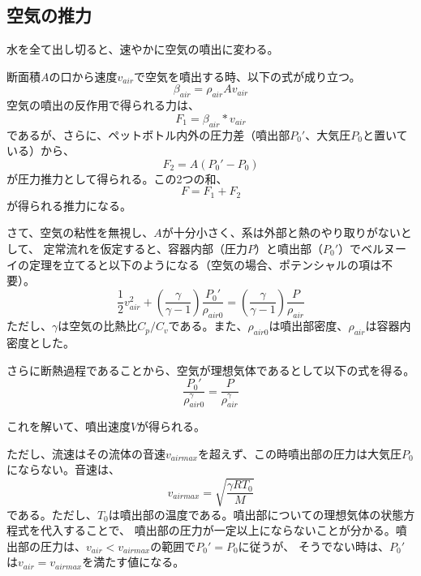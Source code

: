 \documentclass{article}
\begin{document}
\subsection{ 空気の推力 }

水を全て出し切ると、速やかに空気の噴出に変わる。

断面積$A$の口から速度$v_{air}$で空気を噴出する時、以下の式が成り立つ。
\begin{equation}
\beta_{air} = \rho_{air} A v_{air}
\end{equation}
空気の噴出の反作用で得られる力は、
\begin{equation}
F_1 = \beta_{air} * v_{air}
\end{equation}
であるが、さらに、ペットボトル内外の圧力差（噴出部$P_0'$、大気圧$P_0$と置いている）から、
\begin{equation}
F_2 = A \left( P_0' - P_0 \right)
\end{equation}
が圧力推力として得られる。この2つの和、
\begin{equation}
F = F_1 + F_2
\end{equation}
が得られる推力になる。

さて、空気の粘性を無視し、$A$が十分小さく、系は外部と熱のやり取りがないとして、
定常流れを仮定すると、容器内部（圧力$P$）と噴出部（$P_0'$）でベルヌーイの定理を立てると以下のようになる（空気の場合、ポテンシャルの項は不要）。
\begin{equation}
\frac{1}{2} v_{air}^2 + \left( \frac{\gamma}{\gamma - 1} \right)\frac{P_0'}{\rho_{air0}} =  \left( \frac{\gamma}{\gamma - 1} \right)\frac{P}{\rho_{air}}
\end{equation}
ただし、$\gamma$は空気の比熱比${C_p}/{C_v}$である。また、$\rho_{air0}$は噴出部密度、$\rho_{air}$は容器内密度とした。

さらに断熱過程であることから、空気が理想気体であるとして以下の式を得る。
\begin{equation}
\frac{P_0'}{\rho_{air0}^\gamma} = \frac{P}{\rho_{air}^\gamma}
\end{equation}

これを解いて、噴出速度$V$が得られる。

ただし、流速はその流体の音速$v_{airmax}$を超えず、この時噴出部の圧力は大気圧$P_0$にならない。音速は、
\begin{equation}
v_{airmax} = \sqrt{\frac{\gamma R T_0}{M}}
\end{equation}
である。ただし、$T_0$は噴出部の温度である。噴出部についての理想気体の状態方程式を代入することで、
噴出部の圧力が一定以上にならないことが分かる。噴出部の圧力は、$v_{air} < v_{airmax}$の範囲で$P_0'=P_0$に従うが、
そうでない時は、$P_0'$は$v_{air} = v_{airmax}$を満たす値になる。
\end{document}
